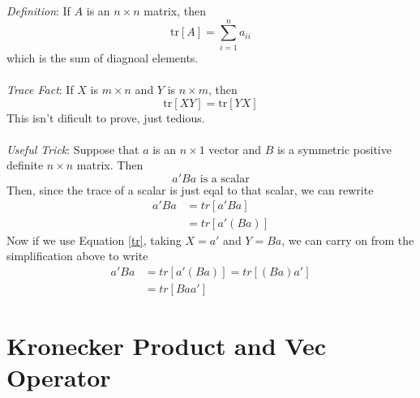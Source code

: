 \documentclass[a4paper,12pt]{scrartcl}
\begin{document}
{\sl Definition}: If $A$ is an $n\times n$ matrix, then 
\begin{equation}
    \text{tr}[A] = \sum^n_{i=1} a_{ii} 
\end{equation}
which is the sum of diagnoal elements.
\\
\\
{\sl Trace Fact}: If $X$ is $m\times n$ and $Y$
is $n\times m$, then
\begin{equation}
    \label{tr}
    \text{tr}[XY] = \text{tr}[YX]
\end{equation}
This isn't dificult to prove, just tedious. 
\\
\\
{\sl Useful Trick}: Suppose that $a$ is an 
$n\times 1$ vector and $B$ is a symmetric
positive definite $n\times n$ matrix. Then 
    \[ a' B a \text{ is a scalar} \]
Then, since the trace of a scalar is just eqal
to that scalar, we can rewrite
\begin{align*}
    a' B a &= tr\left[a' B a \right] \\
    &= tr\left[a' (B a) \right] 
\end{align*}
Now if we use Equation \ref{tr}, taking $X = a'$ and
$Y = Ba$, we can carry on from the simplification
above to write
\begin{align*}
    a' B a &= tr\left[a' (B a) \right]  
	= tr\left[(B a) a' \right]  \\
	&= tr\left[B a a' \right]
\end{align*}


\newpage
\section{Kronecker Product and Vec Operator}
\end{document}

